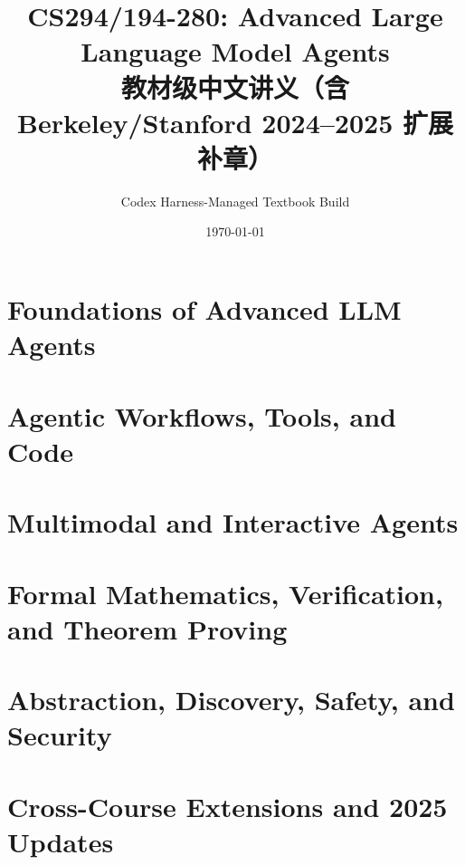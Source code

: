 \documentclass[a4paper]{ctexbook}
\title{CS294/194-280: Advanced Large Language Model Agents\\教材级中文讲义（含 Berkeley/Stanford 2024--2025 扩展补章）}
\author{Codex Harness-Managed Textbook Build}
\date{\today}
\begin{document}
\maketitle
\frontmatter


\tableofcontents
\newpage
\mainmatter
\part{Foundations of Advanced LLM Agents}




\part{Agentic Workflows, Tools, and Code}


\part{Multimodal and Interactive Agents}


\part{Formal Mathematics, Verification, and Theorem Proving}



\part{Abstraction, Discovery, Safety, and Security}


\part{Cross-Course Extensions and 2025 Updates}



\appendix









\end{document}
